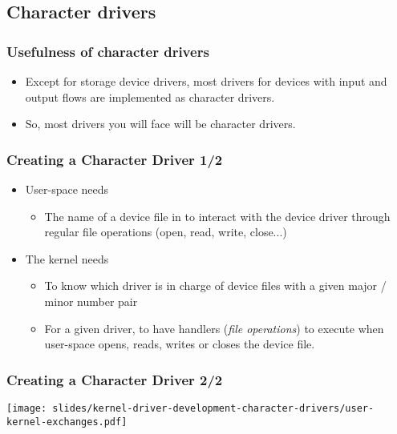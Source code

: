 \subsection{Character drivers}

\begin{frame}
  \frametitle{Usefulness of character drivers}
  \begin{itemize}
  \item Except for storage device drivers, most drivers for devices
    with input and output flows are implemented as character drivers.
  \item So, most drivers you will face will be character drivers.
  \end{itemize}
\end{frame}

\begin{frame}
  \frametitle{Creating a Character Driver 1/2}
  \begin{itemize}
  \item User-space needs
    \begin{itemize}
    \item The name of a device file in  to interact with
      the device driver through regular file operations (open, read,
      write, close...)
    \end{itemize}
  \item The kernel needs
    \begin{itemize}
    \item To know which driver is in charge of device files with a
      given major / minor number pair
    \item For a given driver, to have handlers (\emph{file
        operations}) to execute when user-space opens, reads, writes
      or closes the device file.
    \end{itemize}
  \end{itemize}
\end{frame}


\begin{frame}
  \frametitle{Creating a Character Driver 2/2}
  \begin{center}
    \texttt{[image: slides/kernel-driver-development-character-drivers/user-kernel-exchanges.pdf]}
  \end{center}
\end{frame}

